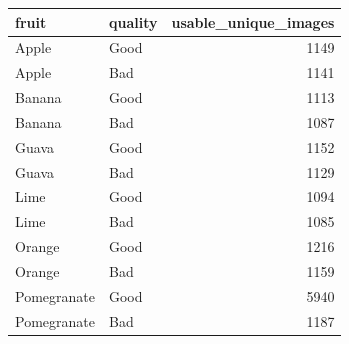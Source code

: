 \begin{tabular}{llr}
\toprule
fruit & quality & usable_unique_images \\
\midrule
Apple & Good & 1149 \\
Apple & Bad & 1141 \\
Banana & Good & 1113 \\
Banana & Bad & 1087 \\
Guava & Good & 1152 \\
Guava & Bad & 1129 \\
Lime & Good & 1094 \\
Lime & Bad & 1085 \\
Orange & Good & 1216 \\
Orange & Bad & 1159 \\
Pomegranate & Good & 5940 \\
Pomegranate & Bad & 1187 \\
\bottomrule
\end{tabular}
